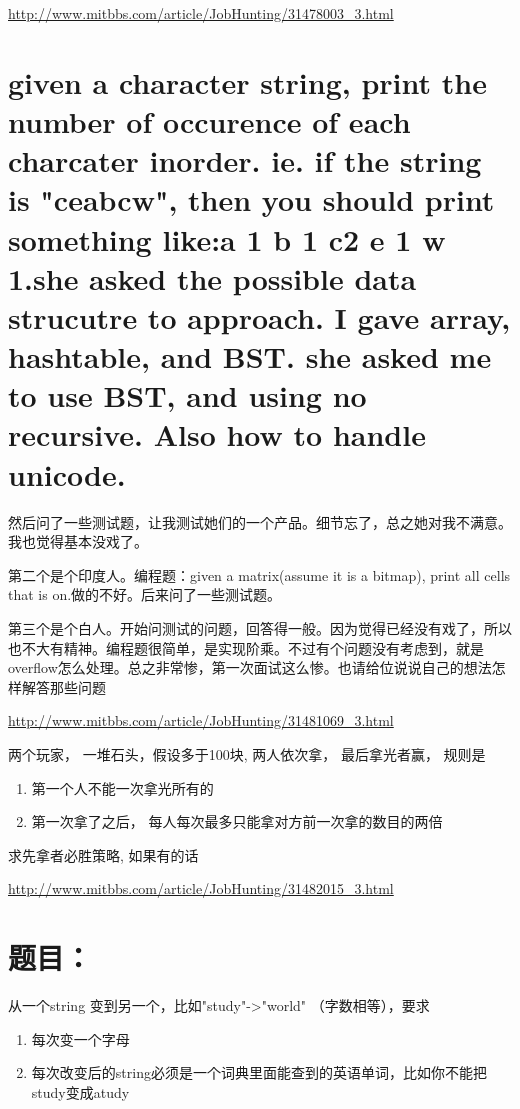 \documentclass[12pt]{book}
\begin{document}
\url{http://www.mitbbs.com/article/JobHunting/31478003_3.html}

\section{given a character string, print the number of occurence of each charcater inorder. ie. if the string is "ceabcw", then you should print something like:a 1 b 1 c2 e 1 w 1.she asked the possible data strucutre to approach. I gave array, hashtable, and BST. she asked me to use BST, and using no recursive. Also how to handle unicode.}
\label{sec-24-11}

然后问了一些测试题，让我测试她们的一个产品。细节忘了，总之她对我不满意。我也觉得基本没戏了。

第二个是个印度人。编程题：given a matrix(assume it is a bitmap), print all cells that is on.做的不好。后来问了一些测试题。

第三个是个白人。开始问测试的问题，回答得一般。因为觉得已经没有戏了，所以也不大有精神。编程题很简单，是实现阶乘。不过有个问题没有考虑到，就是overflow怎么处理。总之非常惨，第一次面试这么惨。也请给位说说自己的想法怎样解答那些问题

\url{http://www.mitbbs.com/article/JobHunting/31481069_3.html}

两个玩家， 一堆石头，假设多于100块, 两人依次拿， 最后拿光者赢， 规则是

\begin{enumerate}
\item 第一个人不能一次拿光所有的

\item 第一次拿了之后， 每人每次最多只能拿对方前一次拿的数目的两倍
\end{enumerate}

求先拿者必胜策略, 如果有的话

\url{http://www.mitbbs.com/article/JobHunting/31482015_3.html}

\section{题目：}
\label{sec-24-12}

从一个string 变到另一个，比如"study"->"world" （字数相等），要求

\begin{enumerate}
\item 每次变一个字母

\item 每次改变后的string必须是一个词典里面能查到的英语单词，比如你不能把study变成atudy
\end{enumerate}
\end{document}
